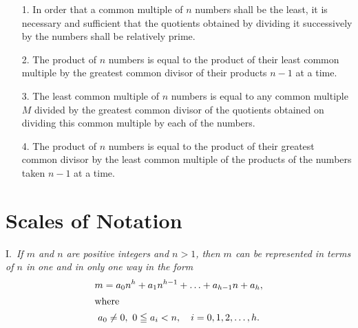 \documentclass[oneside]{book}
\begin{document}
\small \begin{enumerate}
\item[1.] In order that a common multiple of $n$ numbers shall be
the least, it is necessary and sufficient that the quotients
obtained by dividing it successively by the numbers shall be
relatively prime.

\item[2.] The product of $n$ numbers is equal to the product of
their least common multiple by the greatest common divisor of their
products $n - 1$ at a time.

\item[3.] The least common multiple of $n$ numbers is equal to any
common multiple $M$ divided by the greatest common divisor of the
quotients obtained on dividing this common multiple by each of the
numbers.

\item[4.] The product of $n$ numbers is equal to the product of their
greatest common divisor by the least common multiple of the products
of the numbers taken $n - 1$ at a time.
\end{enumerate} \normalsize%

\section{Scales of Notation}\label{s11}

I.~\emph{If $m$ and $n$ are positive integers and $n > 1$, then $m$
can be represented in terms of $n$ in one and in only one way in the
form}
\begin{gather*}
m = a_0 n^h + a_1 n^{h-1} + \ldots + a_{h-1} n + a_h, \\
\intertext{where}
a_0 \ne 0,\ 0 \leqq a_i < n, \quad i = 0, 1, 2, \ldots, h.
\end{gather*}
\end{document}
